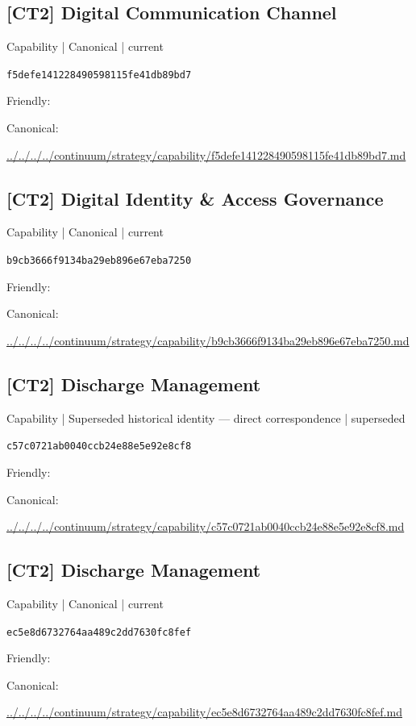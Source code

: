 \documentclass[10pt,a4paper]{article}
\begin{document}
\subsection*{[CT2] Digital Communication Channel}
{\small Capability | Canonical | current}\par
\texttt{f5defe141228490598115fe41db89bd7}\par
Friendly: \par
Canonical: \par
{\footnotesize\url{../../../../continuum/strategy/capability/f5defe141228490598115fe41db89bd7.md}}\par
\subsection*{[CT2] Digital Identity \& Access Governance}
{\small Capability | Canonical | current}\par
\texttt{b9cb3666f9134ba29eb896e67eba7250}\par
Friendly: \par
Canonical: \par
{\footnotesize\url{../../../../continuum/strategy/capability/b9cb3666f9134ba29eb896e67eba7250.md}}\par
\subsection*{[CT2] Discharge Management}
{\small Capability | Superseded historical identity — direct correspondence | superseded}\par
\texttt{c57c0721ab0040ccb24e88e5e92e8cf8}\par
Friendly: \par
Canonical: \par
{\footnotesize\url{../../../../continuum/strategy/capability/c57c0721ab0040ccb24e88e5e92e8cf8.md}}\par
\subsection*{[CT2] Discharge Management}
{\small Capability | Canonical | current}\par
\texttt{ec5e8d6732764aa489c2dd7630fc8fef}\par
Friendly: \par
Canonical: \par
{\footnotesize\url{../../../../continuum/strategy/capability/ec5e8d6732764aa489c2dd7630fc8fef.md}}\par
\end{document}
